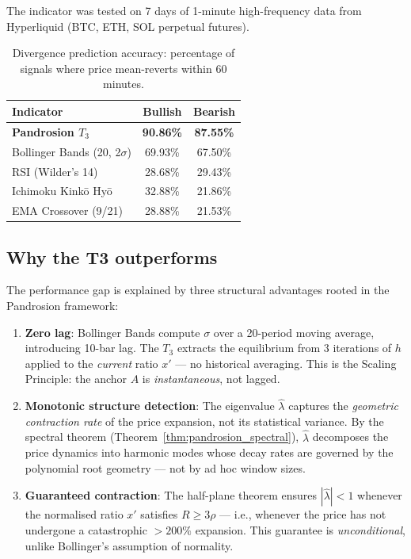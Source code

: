 \documentclass[10pt,a4paper,oneside]{book}
\theoremstyle{definition}
\theoremstyle{remark}
\begin{document}
The indicator was tested on 7 days of 1-minute high-frequency data from Hyperliquid (BTC, ETH, SOL perpetual futures).

\begin{table}[h]
\centering
\caption{Divergence prediction accuracy: percentage of signals where price mean-reverts within 60 minutes.}
\label{tab:t4_comparison}
\renewcommand{\arraystretch}{1.2}
\begin{tabular}{@{}lcc@{}}
\toprule
\textbf{Indicator} & \textbf{Bullish} & \textbf{Bearish} \\
\midrule
\textbf{Pandrosion $T_3$} & \textbf{90.86\%} & \textbf{87.55\%} \\
Bollinger Bands (20, 2$\sigma$) & 69.93\% & 67.50\% \\
RSI (Wilder's 14) & 28.68\% & 29.43\% \\
Ichimoku Kink\=o Hy\=o & 32.88\% & 21.86\% \\
EMA Crossover (9/21) & 28.88\% & 21.53\% \\
\bottomrule
\end{tabular}
\end{table}

\subsection{Why the T3 outperforms}

The performance gap is explained by three structural advantages rooted in the Pandrosion framework:

\begin{enumerate}
\item \textbf{Zero lag}: Bollinger Bands compute $\sigma$ over a 20-period moving average, introducing 10-bar lag.  The $T_3$ extracts the equilibrium from 3 iterations of $h$ applied to the \emph{current} ratio $x'$ --- no historical averaging.  This is the Scaling Principle: the anchor $A$ is \emph{instantaneous}, not lagged.

\item \textbf{Monotonic structure detection}: The eigenvalue $\hat{\lambda}$ captures the \emph{geometric contraction rate} of the price expansion, not its statistical variance.  By the spectral theorem (Theorem~\ref{thm:pandrosion_spectral}), $\hat{\lambda}$ decomposes the price dynamics into harmonic modes whose decay rates are governed by the polynomial root geometry --- not by ad hoc window sizes.

\item \textbf{Guaranteed contraction}: The half-plane theorem ensures $|\hat{\lambda}| < 1$ whenever the normalised ratio $x'$ satisfies $R \geq 3\rho$ --- i.e., whenever the price has not undergone a catastrophic $> 200\%$ expansion.  This guarantee is \emph{unconditional}, unlike Bollinger's assumption of normality.
\end{enumerate}
\end{document}
